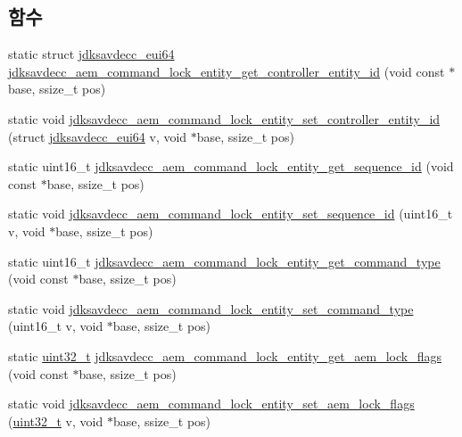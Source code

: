 \subsection*{함수}
\begin{DoxyCompactItemize}
\item 
static struct \hyperlink{structjdksavdecc__eui64}{jdksavdecc\+\_\+eui64} \hyperlink{group__command__lock__entity_ga2945717e213e7601af926acb95c3230c}{jdksavdecc\+\_\+aem\+\_\+command\+\_\+lock\+\_\+entity\+\_\+get\+\_\+controller\+\_\+entity\+\_\+id} (void const $\ast$base, ssize\+\_\+t pos)
\item 
static void \hyperlink{group__command__lock__entity_gad780dab898d62eb1d92ecd34596b6f00}{jdksavdecc\+\_\+aem\+\_\+command\+\_\+lock\+\_\+entity\+\_\+set\+\_\+controller\+\_\+entity\+\_\+id} (struct \hyperlink{structjdksavdecc__eui64}{jdksavdecc\+\_\+eui64} v, void $\ast$base, ssize\+\_\+t pos)
\item 
static uint16\+\_\+t \hyperlink{group__command__lock__entity_ga81af4be0f7617242ecd32c2447e726a0}{jdksavdecc\+\_\+aem\+\_\+command\+\_\+lock\+\_\+entity\+\_\+get\+\_\+sequence\+\_\+id} (void const $\ast$base, ssize\+\_\+t pos)
\item 
static void \hyperlink{group__command__lock__entity_ga41df58848db09af281d653ebed76c7de}{jdksavdecc\+\_\+aem\+\_\+command\+\_\+lock\+\_\+entity\+\_\+set\+\_\+sequence\+\_\+id} (uint16\+\_\+t v, void $\ast$base, ssize\+\_\+t pos)
\item 
static uint16\+\_\+t \hyperlink{group__command__lock__entity_ga2176d91d9a68d4a1fece41394f5d63df}{jdksavdecc\+\_\+aem\+\_\+command\+\_\+lock\+\_\+entity\+\_\+get\+\_\+command\+\_\+type} (void const $\ast$base, ssize\+\_\+t pos)
\item 
static void \hyperlink{group__command__lock__entity_gac5d44db85c50a176a0c8b0fd9e22c4b6}{jdksavdecc\+\_\+aem\+\_\+command\+\_\+lock\+\_\+entity\+\_\+set\+\_\+command\+\_\+type} (uint16\+\_\+t v, void $\ast$base, ssize\+\_\+t pos)
\item 
static \hyperlink{parse_8c_a6eb1e68cc391dd753bc8ce896dbb8315}{uint32\+\_\+t} \hyperlink{group__command__lock__entity_gae97b762cf1d891e376ce6c49107967f5}{jdksavdecc\+\_\+aem\+\_\+command\+\_\+lock\+\_\+entity\+\_\+get\+\_\+aem\+\_\+lock\+\_\+flags} (void const $\ast$base, ssize\+\_\+t pos)
\item 
static void \hyperlink{group__command__lock__entity_ga4bcd285b45e809e4db88edd407f876e3}{jdksavdecc\+\_\+aem\+\_\+command\+\_\+lock\+\_\+entity\+\_\+set\+\_\+aem\+\_\+lock\+\_\+flags} (\hyperlink{parse_8c_a6eb1e68cc391dd753bc8ce896dbb8315}{uint32\+\_\+t} v, void $\ast$base, ssize\+\_\+t pos)

\end{DoxyCompactItemize}
